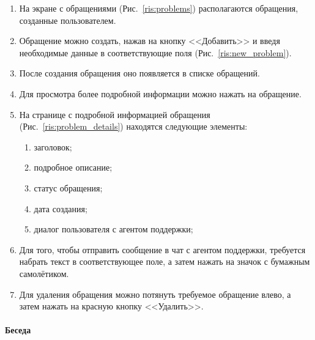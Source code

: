 \documentclass{../includes/TechDoc}
\begin{document}
    \begin{enumerate}
        \item На экране с обращениями (Рис.~\ref{ris:problems}) располагаются обращения, созданные пользователем.

        \item Обращение можно создать, нажав на кнопку <<Добавить>> и введя необходимые данные в соответствующие поля (Рис.~\ref{ris:new_problem}).

        \item После создания обращения оно появляется в списке обращений.
        \item Для просмотра более подробной информации можно нажать на обращение.
        \item На странице с подробной информацией обращения (Рис.~\ref{ris:problem_details}) находятся следующие элементы:
        \begin{enumerate}
            \item заголовок;
            \item подробное описание;
            \item статус обращения;
            \item дата создания;
            \item диалог пользователя с агентом поддержки;
        \end{enumerate}

        \item Для того, чтобы отправить сообщение в чат с агентом поддержки, требуется набрать текст
        в соответствующее поле, а затем нажать на значок с бумажным самолётиком.

        \item Для удаления обращения можно потянуть требуемое обращение влево, а затем нажать на красную кнопку <<Удалить>>.
    \end{enumerate}

    \clearpage

    \paragraph{Беседа}
\end{document}
